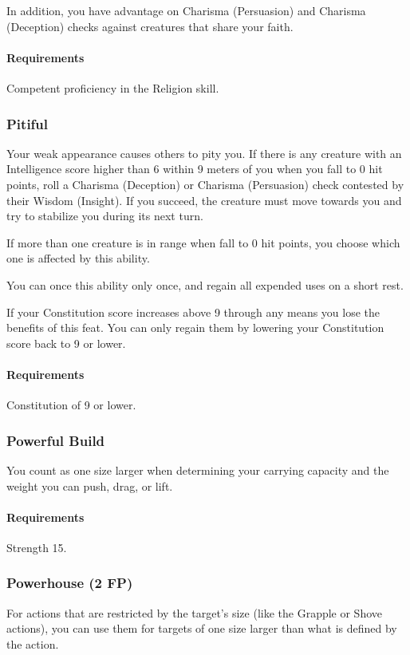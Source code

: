     In addition, you have advantage on Charisma (Persuasion) and Charisma (Deception) checks against creatures that share your faith.
    \paragraph{Requirements} Competent proficiency in the Religion skill.
\subsubsection{Pitiful} \label{feat::pitiful}
    Your weak appearance causes others to pity you.
    If there is any creature with an Intelligence score higher than 6 within 9 meters of you when you fall to 0 hit points, roll a Charisma (Deception) or Charisma (Persuasion) check contested by their Wisdom (Insight).
    If you succeed, the creature must move towards you and try to stabilize you during its next turn.

    If more than one creature is in range when fall to 0 hit points, you choose which one is affected by this ability.

    You can once this ability only once, and regain all expended uses on a short rest.

    If your Constitution score increases above 9 through any means you lose the benefits of this feat.
    You can only regain them by lowering your Constitution score back to 9 or lower.
    \paragraph{Requirements} Constitution of 9 or lower.
\subsubsection{Powerful Build} \label{feat::powerfulbuild_skill}
    You count as one size larger when determining your carrying capacity and the weight you can push, drag, or lift.
    \paragraph{Requirements} Strength 15.
\subsubsection{Powerhouse (2 FP)} \label{feat::powerhouse}
    For actions that are restricted by the target's size (like the Grapple or Shove actions), you can use them for targets of one size larger than what is defined by the action.
